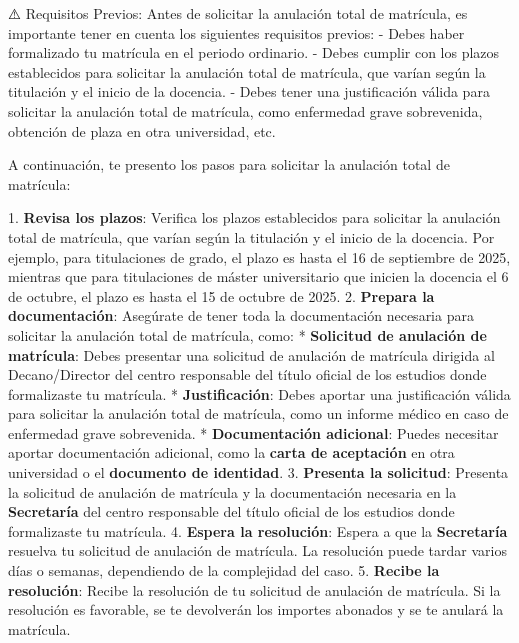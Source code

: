 \documentclass{article}
\begin{document}
\begin{itemize}
\begin{itemize}
                ⚠️ Requisitos Previos:
                Antes de solicitar la anulación total de matrícula, es importante tener en cuenta los siguientes requisitos previos:
                - Debes haber formalizado tu matrícula en el periodo ordinario.
                - Debes cumplir con los plazos establecidos para solicitar la anulación total de matrícula, que varían según la titulación y el inicio de la docencia.
                - Debes tener una justificación válida para solicitar la anulación total de matrícula, como enfermedad grave sobrevenida, obtención de plaza en otra universidad, etc.

                A continuación, te presento los pasos para solicitar la anulación total de matrícula:

                1. \textbf{Revisa los plazos}: Verifica los plazos establecidos para solicitar la anulación total de matrícula, que varían según la titulación y el inicio de la docencia. Por ejemplo, para titulaciones de grado, el plazo es hasta el 16 de septiembre de 2025, mientras que para titulaciones de máster universitario que inicien la docencia el 6 de octubre, el plazo es hasta el 15 de octubre de 2025.
                2. \textbf{Prepara la documentación}: Asegúrate de tener toda la documentación necesaria para solicitar la anulación total de matrícula, como:
                * \textbf{Solicitud de anulación de matrícula}: Debes presentar una solicitud de anulación de matrícula dirigida al Decano/Director del centro responsable del título oficial de los estudios donde formalizaste tu matrícula.
                * \textbf{Justificación}: Debes aportar una justificación válida para solicitar la anulación total de matrícula, como un informe médico en caso de enfermedad grave sobrevenida.
                * \textbf{Documentación adicional}: Puedes necesitar aportar documentación adicional, como la \textbf{carta de aceptación} en otra universidad o el \textbf{documento de identidad}.
                3. \textbf{Presenta la solicitud}: Presenta la solicitud de anulación de matrícula y la documentación necesaria en la \textbf{Secretaría} del centro responsable del título oficial de los estudios donde formalizaste tu matrícula.
                4. \textbf{Espera la resolución}: Espera a que la \textbf{Secretaría} resuelva tu solicitud de anulación de matrícula. La resolución puede tardar varios días o semanas, dependiendo de la complejidad del caso.
                5. \textbf{Recibe la resolución}: Recibe la resolución de tu solicitud de anulación de matrícula. Si la resolución es favorable, se te devolverán los importes abonados y se te anulará la matrícula.


\end{itemize}
\end{itemize}
\end{document}
